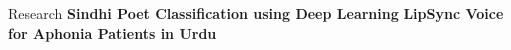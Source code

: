 \begin{rubric}{Research}
\entry*\textbf{Sindhi Poet Classification using Deep Learning}
\entry*\textbf{LipSync Voice for Aphonia Patients in Urdu}    
\end{rubric}